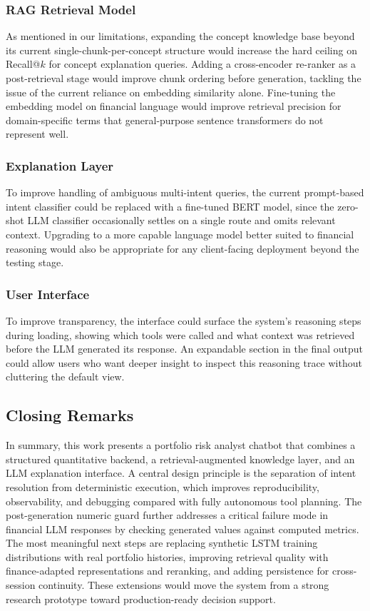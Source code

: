 \subsubsection{RAG Retrieval Model}
As mentioned in our limitations, expanding the concept knowledge base beyond its current single-chunk-per-concept structure would increase the hard ceiling on Recall@$k$ for concept explanation queries. Adding a cross-encoder re-ranker as a post-retrieval stage would improve chunk ordering before generation, tackling the issue of the current reliance on embedding similarity alone. Fine-tuning the embedding model on financial language would improve retrieval precision for domain-specific terms that general-purpose sentence transformers do not represent well.

\subsubsection{Explanation Layer}
To improve handling of ambiguous multi-intent queries, the current prompt-based intent classifier could be replaced with a fine-tuned BERT model, since the zero-shot LLM classifier occasionally settles on a single route and omits relevant context. Upgrading to a more capable language model better suited to financial reasoning would also be appropriate for any client-facing deployment beyond the testing stage.

\subsubsection{User Interface}
To improve transparency, the interface could surface the system's reasoning steps during loading, showing which tools were called and what context was retrieved before the LLM generated its response. An expandable section in the final output could allow users who want deeper insight to inspect this reasoning trace without cluttering the default view.

\subsection{Closing Remarks}
In summary, this work presents a portfolio risk analyst chatbot that combines a structured quantitative backend, a retrieval-augmented knowledge layer, and an LLM explanation interface. A central design principle is the separation of intent resolution from deterministic execution, which improves reproducibility, observability, and debugging compared with fully autonomous tool planning. The post-generation numeric guard further addresses a critical failure mode in financial LLM responses by checking generated values against computed metrics. The most meaningful next steps are replacing synthetic LSTM training distributions with real portfolio histories, improving retrieval quality with finance-adapted representations and reranking, and adding persistence for cross-session continuity. These extensions would move the system from a strong research prototype toward production-ready decision support.
